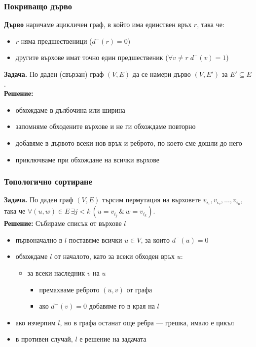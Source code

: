 \documentclass{beamer}
\begin{document}
\begin{frame}
  \frametitle{Покриващо дърво}
  \begin{definition}
    \small
    \textbf{Дърво} наричаме ацикличен граф, в който има единствен връх $r$, така че:
    \begin{itemize}
    \item $r$ няма предшественици ($d^-(r) = 0$)
    \item другите върхове имат точно един предшественик ($\forall v\neq r\;d^-(v) = 1$)
    \end{itemize}
  \end{definition}
  \pause
  \textbf{Задача. }По даден (свързан) граф $(V,E)$ да се намери дърво $(V,E')$ за $E' \subseteq E$.\\
  \pause
  \textbf{Решение:}\\
  \begin{itemize}[<+->]
  \item обхождаме в дълбочина или ширина
  \item запомняме обходените върхове и не ги обхождаме повторно
  \item добавяме в дървото всеки нов връх и реброто, по което сме дошли до него
  \item приключваме при обхождане на всички върхове
  \end{itemize}
\end{frame}

\begin{frame}
  \frametitle{Топологично сортиране}
  \textbf{Задача. }По даден граф $(V,E)$ търсим пермутация на върховете $v_{i_1},v_{i_2},\ldots,v_{i_n}$, така че $\forall (u,w)\in E\,\exists j < k\,(u = v_{i_j}\,\&\,w = v_{i_k})$.\\
  \pause
  \textbf{Решение: }Събираме списък от върхове $l$\\
  \begin{itemize}[<+->]
  \item първоначално в $l$ поставяме всички $u\in V$, за които $d^-(u) = 0$
  \item обхождаме $l$ от началото, като за всеки обходен връх $u$:
    \begin{itemize}
    \item за всеки наследник $v$ на $u$
      \begin{itemize}
      \item премахваме реброто $(u,v)$ от графа
      \item ако $d^-(v) = 0$ добавяме го в края на $l$
      \end{itemize}
    \end{itemize}
  \item ако изчерпим $l$, но в графа останат още ребра --- грешка, имало е цикъл
  \item в противен случай, $l$ е решение на задачата
  \end{itemize}
\end{frame}
\end{document}
